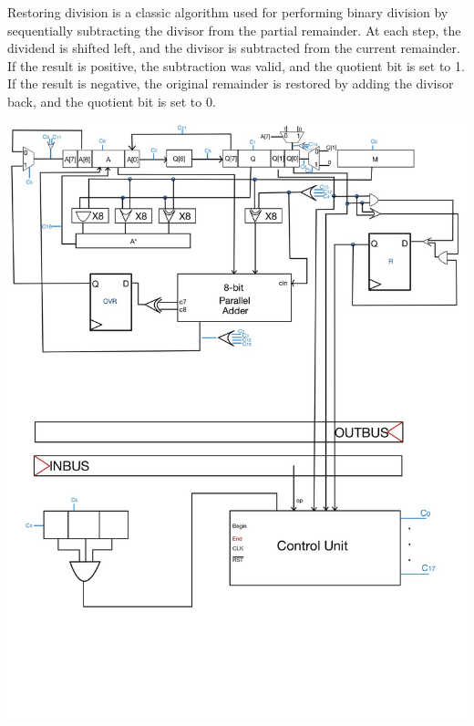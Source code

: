 \documentclass[12pt, letterpaper]{article}
\begin{document}
Restoring division is a classic algorithm used for performing binary division by sequentially subtracting the divisor from the partial remainder. At each step, the dividend is shifted left, and the divisor is subtracted from the
current remainder. If the result is positive, the subtraction was valid, and the quotient bit is set to 1. If the result is negative, the original remainder is restored by adding the divisor back, and the quotient bit is set to 0.\\


\begin{center}
\includegraphics[scale=0.3]{Documentation/ALU}
\end{center}
\end{document}
